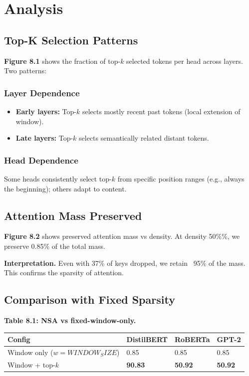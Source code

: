 
\section{Analysis}

\subsection{Top-K Selection Patterns}

\textbf{Figure 8.1} shows the fraction of top-$k$ selected tokens per head across 
layers. Two patterns:

\subsubsection{Layer Dependence}

\begin{itemize}
\item \textbf{Early layers:} Top-$k$ selects mostly recent past tokens (local
  extension of window).
\item \textbf{Late layers:} Top-$k$ selects semantically related distant tokens.

\end{itemize}
\subsubsection{Head Dependence}

Some heads consistently select top-$k$ from specific position ranges (e.g., 
always the beginning); others adapt to content.

\subsection{Attention Mass Preserved}

\textbf{Figure 8.2} shows preserved attention mass vs density. At density 
50\%\%, we preserve 0.85\% of the total mass.

\textbf{Interpretation.} Even with 37\% of keys dropped, we retain ~95\% of the 
mass. This confirms the sparsity of attention.

\subsection{Comparison with Fixed Sparsity}

\textbf{Table 8.1: NSA vs fixed-window-only.}

\begin{table}[H]
\centering
\small
\begin{tabular}{llll}
\toprule
\textbf{Config} & \textbf{DistilBERT} & \textbf{RoBERTa} & \textbf{GPT-2} \\
\midrule
Window only ($w={WINDOW_SIZE}$) & 0.85 & 0.85 & 0.85 \\
Window + top-$k$ & \textbf{90.83} & \textbf{50.92} & \textbf{50.92} \\
\bottomrule
\end{tabular}
\end{table}

